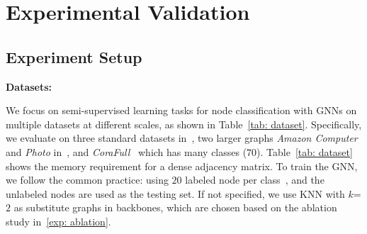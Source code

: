 \section{Experimental  Validation} \label{sec: experiment}

\subsection{Experiment Setup} \label{exp: setup}

\noindent\textbf{Datasets:} 
\begin{table}[h]
    \centering
    \vspace{-5mm}
    \caption{Dataset Used in \mymethod Validation}
    \label{tab: dataset}
\end{table}
We focus on semi-supervised learning tasks for node classification with GNNs on multiple datasets at different scales, as shown in Table~\ref{tab: dataset}.
Specifically, we evaluate \mymethod on three standard datasets in~\cite{yang2016revisiting}, two larger graphs \textit{Amazon Computer} and \textit{Photo} in~\cite{shchur2018pitfalls}, and \textit{CoraFull}~\cite{bojchevski2017deep} which has many classes ($70$).
Table~\ref{tab: dataset} shows the memory requirement for a dense adjacency matrix.
To train the GNN, we follow the common practice: using $20$ labeled node per class~\cite{shchur2018pitfalls}, and the unlabeled nodes are used as the testing set.
If not specified, we use KNN with $k$=$2$ as substitute graphs in backbones, which are chosen based on the ablation study in~\ref{exp: ablation}.

